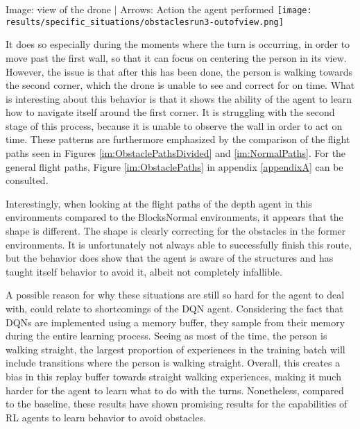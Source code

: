 \begin{Figure}
    \centering
    \small
    Image: view of the drone $|$ Arrows: Action the agent performed
    \texttt{[image: results/specific\_situations/obstaclesrun3-outofview.png]}
    \label{im:run3loses}
\end{Figure}

It does so especially during the moments where the turn is occurring, in 
order to move past the first wall, so that it can focus on centering the person in its view. 
However, the issue is that after this has been done, the person is walking towards the 
second corner, which the drone is unable to see and correct for on time. 
What is interesting about this behavior is that it shows the ability of the agent to 
learn how to navigate itself around the first corner. It is struggling 
with the second stage of this process, because it is unable to observe the wall 
in order to act on time. These patterns are furthermore emphasized by the comparison of 
the flight paths seen in Figures \ref{im:ObstaclePathsDivided} and \ref{im:NormalPaths}.
For the general flight paths, Figure \ref{im:ObstaclePaths} in appendix \ref{appendixA} 
can be consulted. 

Interestingly, when looking at the flight paths of the depth agent in this environments 
compared to the BlocksNormal environments, it appears that the shape 
is different. The shape is clearly correcting for the obstacles 
in the former environments. It is unfortunately not always able to successfully finish 
this route, but the behavior does show that the agent is aware of the structures and 
has taught itself behavior to avoid it, albeit not completely infallible. 

A possible reason for why these situations are still so hard for the agent to deal with, 
could relate to shortcomings of the DQN agent. Considering the fact that DQNs 
are implemented using a memory buffer, they sample from their memory during the 
entire learning process. Seeing as most of the time, the person is walking 
straight, the largest proportion of experiences in the training batch will include 
transitions where the person is walking straight. Overall, this creates a bias 
in this replay buffer towards straight walking experiences, making it much harder 
for the agent to learn what to do with the turns. Nonetheless, compared to the 
baseline, these results have shown promising results for the capabilities of RL 
agents to learn behavior to avoid obstacles. \newline


